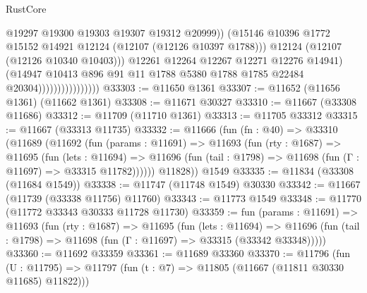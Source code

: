 \begin{lexlean}{RustCore}
\begin{coremodule}
                                          @19297
                                          @19300
                                          @19303
                                          @19307
                                          @19312
                                          @20999))
                                      (@15146
                                        @10396
                                        @1772
                                        @15152
                                        @14921
                                        @12124
                                        (@12107 (@12126 @10397 @1788)))
                                      @12124
                                      (@12107 (@12126 @10340 @10403)))
                                    @12261
                                    @12264
                                    @12267
                                    @12271
                                    @12276
                                    @14941)
                                  (@14947
                                    @10413
                                    @896
                                    @91
                                    @11
                                    @1788
                                    @5380
                                    @1788
                                    @1785
                                    @22484
                                    @20304))))))))))))))))
@33303 := @11650 @1361
@33307 := @11652 (@11656 @1361) (@11662 @1361)
@33308 := @11671 @30327
@33310 := @11667 (@33308 @11686)
@33312 := @11709 (@11710 @1361)
@33313 := @11705 @33312
@33315 := @11667 (@33313 @11735)
@33332 := @11666
    (fun (fn : @40) =>
    @33310
      (@11689
        (@11692
          (fun (params : @11691) =>
          @11693
            (fun (rty : @1687) =>
            @11695
              (fun (lets : @11694) =>
              @11696 (fun (tail : @1798) => @11698 (fun (Γ : @11697) => @33315 @11782))))))
        @11828))
    @1549
@33335 := @11834 (@33308 (@11684 @1549))
@33338 := @11747 (@11748 @1549) @30330
@33342 := @11667 (@11739 (@33338 @11756) @11760)
@33343 := @11773 @1549
@33348 := @11770 (@11772 @33343 @30333 @11728 @11730)
@33359 := fun (params : @11691) =>
  @11693
    (fun (rty : @1687) =>
    @11695
      (fun (lets : @11694) =>
      @11696 (fun (tail : @1798) => @11698 (fun (Γ : @11697) => @33315 (@33342 @33348)))))
@33360 := @11692 @33359
@33361 := @11689 @33360
@33370 := @11796
    (fun (U : @11795) => @11797 (fun (t : @7) => @11805 (@11667 (@11811 @30330 @11685) @11822)))

\end{coremodule}
\end{lexlean}
